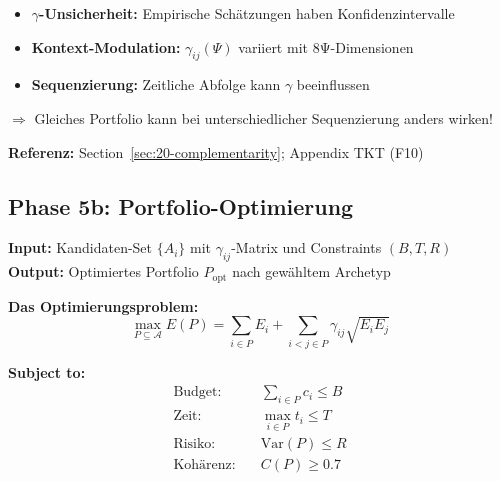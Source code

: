 \begin{tcolorbox}[colback=orange!5!white, colframe=orange!75!black,
    title=\textbf{Variabilität in Phase 5}]
\begin{itemize}[nosep]
\item \textbf{$\gamma$-Unsicherheit:} Empirische Schätzungen haben Konfidenzintervalle
\item \textbf{Kontext-Modulation:} $\gamma_{ij}(\Psi)$ variiert mit 8Ψ-Dimensionen
\item \textbf{Sequenzierung:} Zeitliche Abfolge kann $\gamma$ beeinflussen
\end{itemize}
$\Rightarrow$ Gleiches Portfolio kann bei unterschiedlicher Sequenzierung anders wirken!
\end{tcolorbox}

\textbf{Referenz:} Section~\ref{sec:20-complementarity}; Appendix TKT (F10)

\subsection{Phase 5b: Portfolio-Optimierung}
\label{sec:20-phase5b}

\textbf{Input:} Kandidaten-Set $\{A_i\}$ mit $\gamma_{ij}$-Matrix und Constraints $(B, T, R)$\\
\textbf{Output:} Optimiertes Portfolio $P_{\text{opt}}$ nach gewähltem Archetyp

\textbf{Das Optimierungsproblem:}
\begin{equation}
\boxed{
\max_{P \subseteq \mathcal{A}} E(P) = \sum_{i \in P} E_i + \sum_{i < j \in P} \gamma_{ij} \sqrt{E_i E_j}
}
\end{equation}

\textbf{Subject to:}
\begin{align}
\text{Budget:} \quad & \sum_{i \in P} c_i \leq B \\
\text{Zeit:} \quad & \max_{i \in P} t_i \leq T \\
\text{Risiko:} \quad & \text{Var}(P) \leq R \\
\text{Kohärenz:} \quad & C(P) \geq 0.7
\end{align}

